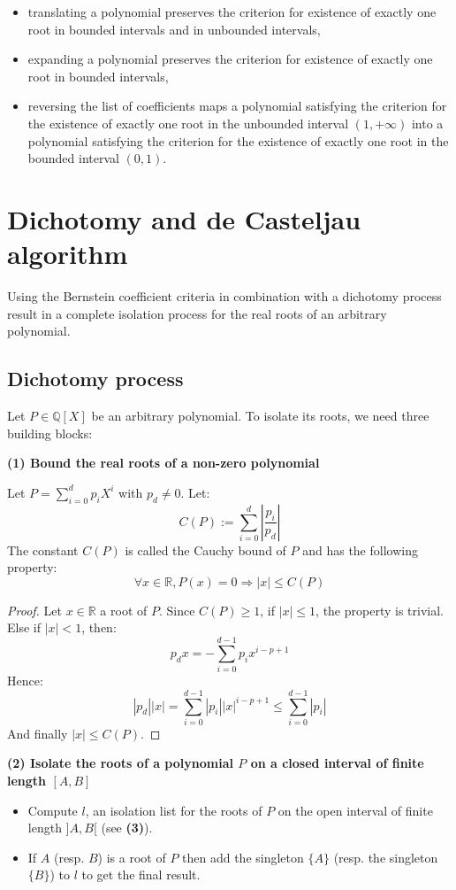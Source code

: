 \documentclass{mscs}
\begin{document}
\begin{itemize}
\item translating a polynomial preserves the criterion for existence
of exactly one root in bounded intervals and in unbounded intervals,
\item expanding a polynomial preserves the criterion for existence of
  exactly one root in bounded intervals,
\item reversing the list of coefficients maps a polynomial satisfying
  the criterion for the existence of exactly one root in the unbounded
  interval \((1,+\infty)\) into a polynomial satisfying the criterion
  for the existence of exactly one root in the bounded interval \((0,1)\).
\end{itemize}

\section{Dichotomy and de Casteljau algorithm}
\label{dichotomy}
Using the Bernstein coefficient criteria in combination with a
dichotomy process result in a complete isolation process for the real
roots of an arbitrary polynomial.

\subsection{Dichotomy process}\label{ssec:dicho}
Let $P \in \mathbb{Q}[X]$ be an arbitrary polynomial. To isolate its
roots, we need three building blocks:

{\bf (1) Bound the real roots of a non-zero polynomial}


\noindent Let $P = \sum_{i = 0}^dp_iX^i$ with $p_d \neq 0$. Let:
$$C(P) := \sum_{i = 0}^d\left|\displaystyle{\frac{p_i}{p_d}}\right|$$
The constant $C(P)$ is called the Cauchy bound of $P$ and has the
following property:
$$\forall x \in \mathbb{R}, P(x) = 0 \Rightarrow |x|\leq C(P)$$
\begin{proof}
Let $x\in \mathbb{R}$ a root of $P$. Since $C(P) \geq 1$, if $|x|\leq
1$, the property is  trivial. Else if $|x| < 1$, then:
$$p_d x = - \sum_{i = 0}^{d - 1} p_i x^{i - p + 1}$$
Hence:
$$|p_d| |x| = \sum_{i = 0}^{d - 1} |p_i| |x|^{i - p + 1} \leq
\sum_{i = 0}^{d - 1} |p_i|$$
And finally $|x| \leq C(P)$.
\end{proof}

{\bf (2) Isolate the roots of a polynomial $P$ on a closed interval of
  finite length $[A, B]$}
\begin{itemize}
\item Compute $l$, an isolation list for  the roots of $P$ on the open
  interval of finite length $]A, B[$ (see {\bf(3)}).
\item If $A$ (resp. $B$) is a root of $P$ then add the singleton
  $\{A\}$ (resp. the singleton $\{B\}$) to $l$ to get the final
  result.
\end{itemize}
\end{document}
